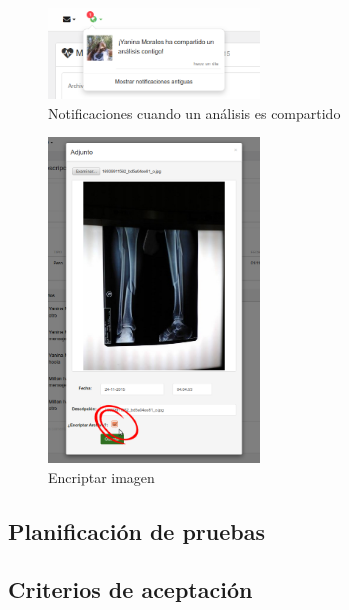         \begin{figure}[h]
        	\centering
        	\includegraphics[width=0.5\textwidth]{img/notificacion_comparticion}
        	\caption{Notificaciones cuando un análisis es compartido}
        	\label{notificacion_comparticion}
        \end{figure}
        
                \begin{figure}[h]
                	\centering
                	\includegraphics[width=0.5\textwidth]{img/encriptar_imagen}
                	\caption{Encriptar imagen}
                	\label{encriptar_imagen}
                \end{figure}
 
\subsection{Planificación de pruebas}                
\subsection{Criterios de aceptación}


